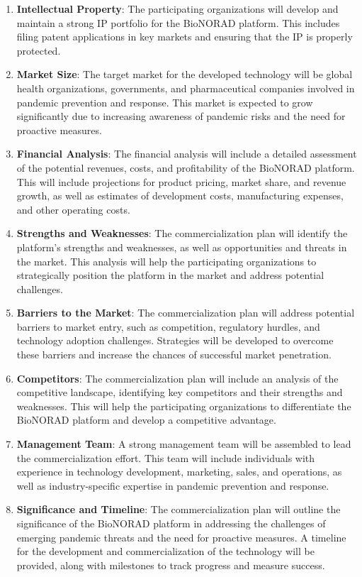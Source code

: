 \documentclass[onecolumn, compsoc,12pt]{IEEEtran}
\begin{document}
\begin{enumerate}
    \item \textbf{Intellectual Property}: The participating organizations will develop and maintain a strong IP portfolio for the BioNORAD platform. This includes filing patent applications in key markets and ensuring that the IP is properly protected.
    \item \textbf{Market Size}: The target market for the developed technology will be global health organizations, governments, and pharmaceutical companies involved in pandemic prevention and response. This market is expected to grow significantly due to increasing awareness of pandemic risks and the need for proactive measures.
    \item \textbf{Financial Analysis}: The financial analysis will include a detailed assessment of the potential revenues, costs, and profitability of the BioNORAD platform. This will include projections for product pricing, market share, and revenue growth, as well as estimates of development costs, manufacturing expenses, and other operating costs.
    \item \textbf{Strengths and Weaknesses}: The commercialization plan will identify the platform's strengths and weaknesses, as well as opportunities and threats in the market. This analysis will help the participating organizations to strategically position the platform in the market and address potential challenges.
    \item \textbf{Barriers to the Market}: The commercialization plan will address potential barriers to market entry, such as competition, regulatory hurdles, and technology adoption challenges. Strategies will be developed to overcome these barriers and increase the chances of successful market penetration.
    \item \textbf{Competitors}: The commercialization plan will include an analysis of the competitive landscape, identifying key competitors and their strengths and weaknesses. This will help the participating organizations to differentiate the BioNORAD platform and develop a competitive advantage.
    \item \textbf{Management Team}: A strong management team will be assembled to lead the commercialization effort. This team will include individuals with experience in technology development, marketing, sales, and operations, as well as industry-specific expertise in pandemic prevention and response.
    \item \textbf{Significance and Timeline}: The commercialization plan will outline the significance of the BioNORAD platform in addressing the challenges of emerging pandemic threats and the need for proactive measures. A timeline for the development and commercialization of the technology will be provided, along with milestones to track progress and measure success.
\end{enumerate}
\end{document}
